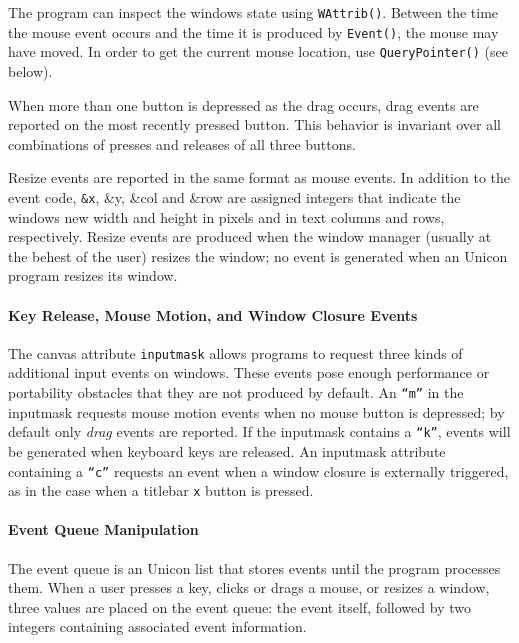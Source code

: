 The program can inspect the window{\textquotesingle}s
state using \texttt{WAttrib()}. Between the time the mouse event
occurs and the time it is produced by \texttt{Event()}, the mouse may
have moved. In order to get the current mouse location, use
\texttt{QueryPointer()} (see below).

When more than one button is depressed as the drag occurs, drag events
are reported on the most recently pressed button. This behavior is
invariant over all combinations of presses and releases of all three buttons.

Resize events are reported in the same format as mouse events.
In addition to the event code, \texttt{\&x}, \&y, \&col and
\&row are assigned integers that indicate the window{\textquotesingle}s
new width and height in pixels and in text columns and rows,
respectively. Resize events are produced when the window manager
(usually at the behest of the user) resizes the window; no event is
generated when an Unicon program resizes its window.

\paragraph{Key Release, Mouse Motion, and Window Closure Events}
The canvas attribute \texttt{inputmask} allows programs to request three kinds
of additional input events on windows. These events pose enough
performance or portability obstacles that they are not produced by
default. An \texttt{{\textquotedblleft}m{\textquotedblright}} in the inputmask
requests mouse motion events when no mouse button is depressed; by default only
{\em drag\/} events are reported. If the
inputmask contains a \texttt{{\textquotedblleft}k{\textquotedblright}}, events
will be generated when keyboard keys are released. An inputmask
attribute containing a \texttt{{\textquotedblleft}c{\textquotedblright}}
requests an event when a window closure is externally triggered,
as in the case when a titlebar
\texttt{x} button is pressed.

\paragraph{Event Queue Manipulation}
The event queue is an Unicon list that stores events until the program
processes them. When a user presses a key, clicks or drags a mouse,
or resizes a window, three values are placed on the event queue: the
event itself, followed by two integers containing associated event
information.

